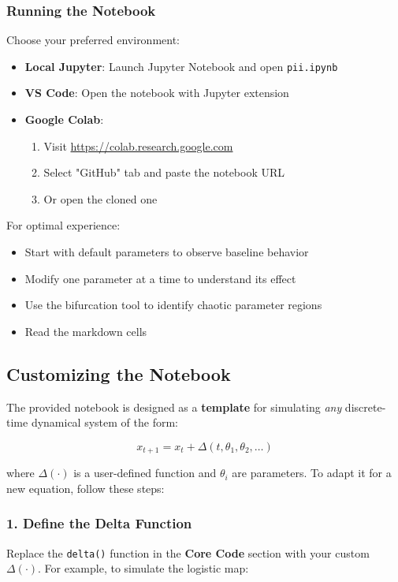 \documentclass[a4paper, 10pt]{article}
\begin{document}
\subsubsection{Running the Notebook}
Choose your preferred environment:
\begin{itemize}
	\item \textbf{Local Jupyter}: Launch Jupyter Notebook and open \texttt{pii.ipynb}
	\item \textbf{VS Code}: Open the notebook with Jupyter extension
	\item \textbf{Google Colab}:
	      \begin{enumerate}
		      \item Visit \url{https://colab.research.google.com}
		      \item Select "GitHub" tab and paste the notebook URL
		      \item Or open the cloned one
	      \end{enumerate}
\end{itemize}

For optimal experience:
\begin{itemize}
	\item Start with default parameters to observe baseline behavior
	\item Modify one parameter at a time to understand its effect
	\item Use the bifurcation tool to identify chaotic parameter regions
	\item Read the markdown cells
\end{itemize}

\subsection{Customizing the Notebook}
The provided notebook is designed as a \textbf{template} for simulating \textit{any} discrete-time dynamical system of the form:

\begin{equation}  
x_{t+1} = x_t + \Delta(t, \theta_1, \theta_2, \dots)  
\end{equation}

where \(\Delta(\cdot)\) is a user-defined function and \(\theta_i\) are parameters. To adapt it for a new equation, follow these steps:

\subsubsection*{1. Define the Delta Function}
Replace the \texttt{delta()} function in the \textbf{Core Code} section with your custom \(\Delta(\cdot)\). For example, to simulate the logistic map:
\end{document}
